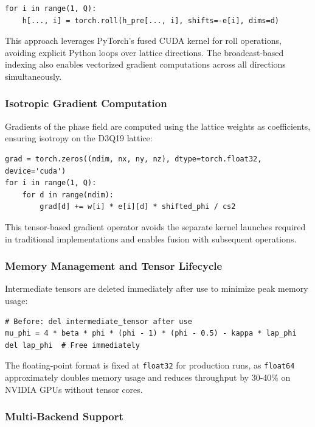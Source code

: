 \begin{verbatim}
for i in range(1, Q):
    h[..., i] = torch.roll(h_pre[..., i], shifts=-e[i], dims=d)
\end{verbatim}

This approach leverages PyTorch's fused CUDA kernel for roll operations, avoiding explicit Python loops over lattice directions. The broadcast-based indexing also enables vectorized gradient computations across all directions simultaneously.

\subsubsection{Isotropic Gradient Computation}

Gradients of the phase field are computed using the lattice weights as coefficients, ensuring isotropy on the D3Q19 lattice:

\begin{verbatim}
grad = torch.zeros((ndim, nx, ny, nz), dtype=torch.float32, device='cuda')
for i in range(1, Q):
    for d in range(ndim):
        grad[d] += w[i] * e[i][d] * shifted_phi / cs2
\end{verbatim}

This tensor-based gradient operator avoids the separate kernel launches required in traditional implementations and enables fusion with subsequent operations.

\subsubsection{Memory Management and Tensor Lifecycle}

Intermediate tensors are deleted immediately after use to minimize peak memory usage:

\begin{verbatim}
# Before: del intermediate_tensor after use
mu_phi = 4 * beta * phi * (phi - 1) * (phi - 0.5) - kappa * lap_phi
del lap_phi  # Free immediately
\end{verbatim}

The floating-point format is fixed at \texttt{float32} for production runs, as \texttt{float64} approximately doubles memory usage and reduces throughput by 30-40\% on NVIDIA GPUs without tensor cores.

\subsubsection{Multi-Backend Support}

